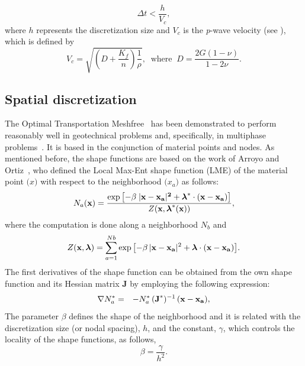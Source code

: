 \documentclass[twocolumn]{svjour3}          %
\begin{document}
  \begin{equation}
\Delta t < \frac{h}{V_c},
\end{equation}
where $h$ represents the discretization size and $V_c$ is the \textit{p}-wave velocity (see \cite{zienkiewicz1980}), which is defined by  
\begin{equation}
V_c=\sqrt{\left( D+\frac{K_f}{n}\right) \frac{1}{\rho}}, \; \; \textrm{where} \;\; D=\frac{2G(1-\nu)}{1-2\nu}.
\end{equation}\label{ex_2}

\subsection{Spatial discretization}
\label{subsec:41}
The Optimal Transportation Meshfree~\cite{li2010,li2014,Huang2019} has been demonstrated to perform reasonably well in geotechnical problems and, specifically, in multiphase problems~\cite{Navas2020}. It is based in the conjunction of material points and nodes. As mentioned before, the shape functions are based on the work of Arroyo and Ortiz~\cite{arroyo2006}, who defined the Local Max-Ent shape function (LME) of the material point $\boldsymbol(x)$ with respect to the neighborhood $\boldsymbol(x_a)$ as follows:
\begin{equation} \label{eq_N1}
N_a(\textbf{x})=\frac{\exp\left[ -\beta \; |\bf x-x_a|^2 +  \boldsymbol{\lambda}^*  \cdot  (x-x_a)  \right] } {Z(\textbf{x},\boldsymbol{\lambda}^*(\textbf{x}))},
\end{equation}
where the computation is done along a neighborhood $N_b$ and 
\begin{equation}\label{eq_N2}
Z({\bf x}, {\boldsymbol{\lambda}}) = \sum_{a=1}^{Nb}{ \exp \left[ -\beta \, |{\bf x-x_a}|^2 + \boldsymbol{\lambda}  \cdot  \bf {(x-x_a)}         \right]}.
\end{equation}
The first derivatives of the shape function can be obtained from the own shape function and its Hessian matrix \textbf{J} by employing the following expression:
\begin{eqnarray}
\nabla N^*_a &=& -N^*_a \,  (\textbf{J}^*)^{-1} \,  (\bf x-x_a) \label{eq_N3} ,
\end{eqnarray}
The parameter $\beta$ defines the shape of the neighborhood and it is related with the discretization size (or nodal spacing), $h$,  and the constant, $\gamma$, which controls the locality of the shape functions, as follows,
\begin{equation}\label{eqLM3}
\beta=\frac{\gamma}{h^2}.
\end{equation} 
\end{document}
